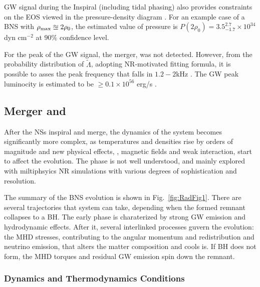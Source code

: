 \ac{GW} signal during the Inspiral (including tidal phasing) also provides constraints 
on the \ac{EOS} viewed in the pressure-density diagram \cite{65}. 
For an example case of a \ac{BNS} with $\rho_{\rm max} \approxeq 2 \rho_0$, 
the estimated value of pressure is $P(2\rho_0)=3.5_{-1.7}^{2.7}\times10^{34}$ dyn cm$^{-2}$ 
at $90\%$ confidence level.

For \GW{} the peak of the \ac{GW} signal, the merger, was not detected. However, from the 
probability distribution of $\tilde{\Lambda}$, adopting \ac{NR}-motivated fitting 
formula, it is possible to asses the peak frequency that falls in $1.2 - 2$kHz \cite{55}.
The \ac{GW} peak luminocity is estimated to be $\geq 0.1\times 10^{56}$ erg/s \cite{61}. 




\subsection{Merger and \pmerg{}}

After the \acp{NS} inspiral and merge, the dynamics of the system becomes significantly 
more complex, as temperatures and densities rise by orders of magnitude and new 
physical effects, \eg, magnetic fields and weak interaction, start to affect the evolution. 
The \pmerg{} phase is not well understood, and mainly explored with miltiphsyics \ac{NR} 
simulations with various degrees of sophistication and resolution. 

The summary of the \ac{BNS} \pmerg{} evolution is shown in Fig.~\ref{fig:RadFig1}. 
There are several trajectories that system can take, depending when the formed remnant 
collapses to a \ac{BH}. The early \pmerg{} phase is charaterized by strong \ac{GW} 
emission and hydrodynamic effects. After it, several interlinked processes guvern the 
evolution: the \ac{MHD} stresses, contributing to the angular momentum and redistribution 
and neutrino emission, that alters the matter composition and cools is.
If \ac{BH} does not form, the \ac{MHD} torques and residual \ac{GW} emission spin down 
the remnant.

\subsubsection{Dynamics and Thermodynamics Conditions}

